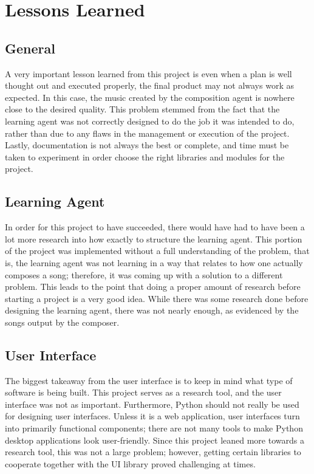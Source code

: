 \documentclass{article}
\begin{document}
\section{Lessons Learned}
\subsection{General}
A very important lesson learned from this project is even when a plan is well thought out and executed properly, the final product may not always work as expected. In this case, the music created by the composition agent is nowhere close to the desired quality. This problem stemmed from the fact that the learning agent was not correctly designed to do the job it was intended to do, rather than due to any flaws in the management or execution of the project. Lastly, documentation is not always the best or complete, and time must be taken to experiment in order choose the right libraries and modules for the project. 

\subsection{Learning Agent}
In order for this project to have succeeded, there would have had to have been a lot more research into how exactly to structure the learning agent. This portion of the project was implemented without a full understanding of the problem, that is, the learning agent was not learning in a way that relates to how one actually composes a song; therefore, it was coming up with a solution to a different problem. This leads to the point that doing a proper amount of research before starting a project is a very good idea. While there was some research done before designing the learning agent, there was not nearly enough, as evidenced by the songs output by the composer. 

\subsection{User Interface}
The biggest takeaway from the user interface is to keep in mind what type of software is being built. This project serves as a research tool, and the user interface was not as important. Furthermore, Python should not really be used for designing user interfaces. Unless it is a web application, user interfaces turn into primarily functional components; there are not many tools to make Python desktop applications look user-friendly. Since this project leaned more towards a research tool, this was not a large problem; however, getting certain libraries to cooperate together with the UI library proved challenging at times.
\end{document}
